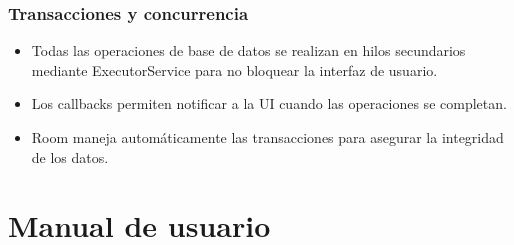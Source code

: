 \documentclass[a4paper,12pt]{report}
\begin{document}
      \subsection{Transacciones y concurrencia}
        \begin{itemize}
          \item Todas las operaciones de base de datos se realizan en hilos secundarios mediante ExecutorService para no bloquear la interfaz de usuario.
          \item Los callbacks permiten notificar a la UI cuando las operaciones se completan.
          \item Room maneja automáticamente las transacciones para asegurar la integridad de los datos.
        \end{itemize}
  \chapter{Manual de usuario}
\end{document}
